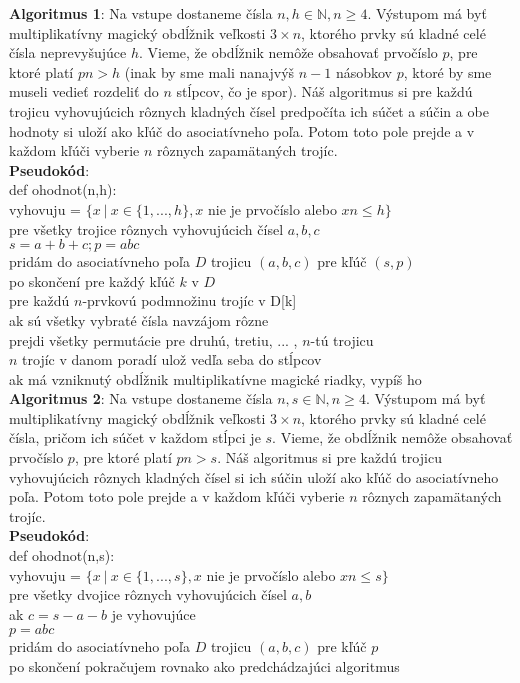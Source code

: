 \documentclass[12pt]{article}
\begin{document}
\textbf{Algoritmus 1}: Na vstupe dostaneme čísla $n,h \in \mathbb{N}, n \geq 4$. Výstupom má byť multiplikatívny magický obdĺžnik veľkosti $3 \times n$, ktorého prvky sú kladné celé čísla neprevyšujúce $h$. Vieme, že obdĺžnik nemôže obsahovať prvočíslo $p$, pre ktoré platí $pn > h$ (inak by sme mali nanajvýš $n-1$ násobkov $p$, ktoré by sme museli vedieť rozdeliť do $n$ stĺpcov, čo je spor). Náš algoritmus si pre každú trojicu vyhovujúcich rôznych kladných čísel predpočíta ich súčet a súčin a obe hodnoty si uloží ako kľúč do asociatívneho poľa. Potom toto pole prejde a v každom kľúči vyberie $n$ rôznych zapamätaných trojíc. \\

\textbf{Pseudokód}: \\
def ohodnot(n,h): \\
vyhovuju = $ \{x ~|~ x \in \{1, ... , h\}, x$ nie je prvočíslo alebo $xn \leq h\}$ \\
pre všetky trojice rôznych vyhovujúcich čísel $a,b,c$ \\
$s = a+b+c; p = abc$ \\
pridám do asociatívneho poľa $D$ trojicu $(a,b,c)$ pre kľúč $(s,p)$ \\
po skončení pre každý kľúč $k$ v $D$ \\
pre každú $n$-prvkovú podmnožinu trojíc v D[k] \\
ak sú všetky vybraté čísla navzájom rôzne \\
prejdi všetky permutácie pre druhú, tretiu, ... , $n$-tú trojicu \\
$n$ trojíc v danom poradí ulož vedľa seba do stĺpcov \\
ak má vzniknutý obdĺžnik multiplikatívne magické riadky, vypíš ho \\

\textbf{Algoritmus 2}: Na vstupe dostaneme čísla $n,s \in \mathbb{N}, n \geq 4$. Výstupom má byť multiplikatívny magický obdĺžnik veľkosti $3 \times n$, ktorého prvky sú kladné celé čísla, pričom ich súčet v každom stĺpci je $s$. Vieme, že obdĺžnik nemôže obsahovať prvočíslo $p$, pre ktoré platí $pn > s$. Náš algoritmus si pre každú trojicu vyhovujúcich rôznych kladných čísel si ich súčin uloží ako kľúč do asociatívneho poľa. Potom toto pole prejde a v každom kľúči vyberie $n$ rôznych zapamätaných trojíc. \\

\textbf{Pseudokód}: \\
def ohodnot(n,s): \\
vyhovuju = $ \{x ~|~ x \in \{1, ... , s\}, x$ nie je prvočíslo alebo $xn \leq s\}$ \\
pre všetky dvojice rôznych vyhovujúcich čísel $a,b$ \\
ak $c = s-a-b$ je vyhovujúce \\
$p = abc$ \\
pridám do asociatívneho poľa $D$ trojicu $(a,b,c)$ pre kľúč $p$ \\
po skončení pokračujem rovnako ako predchádzajúci algoritmus \\
\end{document}
